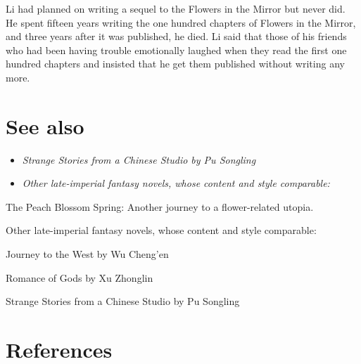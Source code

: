 Li had planned on writing a sequel to the Flowers in the Mirror but
never did. He spent fifteen years writing the one hundred chapters of
Flowers in the Mirror, and three years after it was published, he died.
Li said that those of his friends who had been having trouble
emotionally laughed when they read the first one hundred chapters and
insisted that he get them published without writing any more.

\section{See also}\label{see-also}

\begin{itemize}
\item
  \emph{Strange Stories from a Chinese Studio by Pu Songling}
\item
  \emph{Other late-imperial fantasy novels, whose content and style
  comparable:}
\end{itemize}

The Peach Blossom Spring: Another journey to a flower-related utopia.

Other late-imperial fantasy novels, whose content and style comparable:

Journey to the West by Wu Cheng'en

Romance of Gods by Xu Zhonglin

Strange Stories from a Chinese Studio by Pu Songling

\section{References}\label{references}

